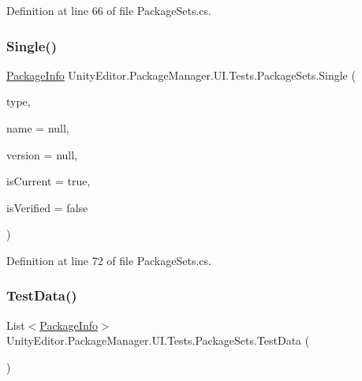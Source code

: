 Definition at line 66 of file Package\+Sets.\+cs.

\mbox{\label{class_unity_editor_1_1_package_manager_1_1_u_i_1_1_tests_1_1_package_sets_ace327849f2fab008bcd128f87d94e898}} 
\subsubsection{\texorpdfstring{Single()}{Single()}\hspace{0.1cm}{\footnotesize\ttfamily [2/2]}}
{\footnotesize\ttfamily \mbox{\hyperlink{class_unity_editor_1_1_package_manager_1_1_u_i_1_1_package_info}{Package\+Info}} Unity\+Editor.\+Package\+Manager.\+U\+I.\+Tests.\+Package\+Sets.\+Single (\begin{DoxyParamCaption}\item[{Package\+Source}]{type,  }\item[{string}]{name = {\ttfamily null},  }\item[{string}]{version = {\ttfamily null},  }\item[{bool}]{is\+Current = {\ttfamily true},  }\item[{bool}]{is\+Verified = {\ttfamily false} }\end{DoxyParamCaption})}



Definition at line 72 of file Package\+Sets.\+cs.

\mbox{\label{class_unity_editor_1_1_package_manager_1_1_u_i_1_1_tests_1_1_package_sets_a17745e089c0a282188b9de778eb9a8b8}} 
\subsubsection{\texorpdfstring{TestData()}{TestData()}}
{\footnotesize\ttfamily List$<$\mbox{\hyperlink{class_unity_editor_1_1_package_manager_1_1_u_i_1_1_package_info}{Package\+Info}}$>$ Unity\+Editor.\+Package\+Manager.\+U\+I.\+Tests.\+Package\+Sets.\+Test\+Data (\begin{DoxyParamCaption}{ }\end{DoxyParamCaption})}



